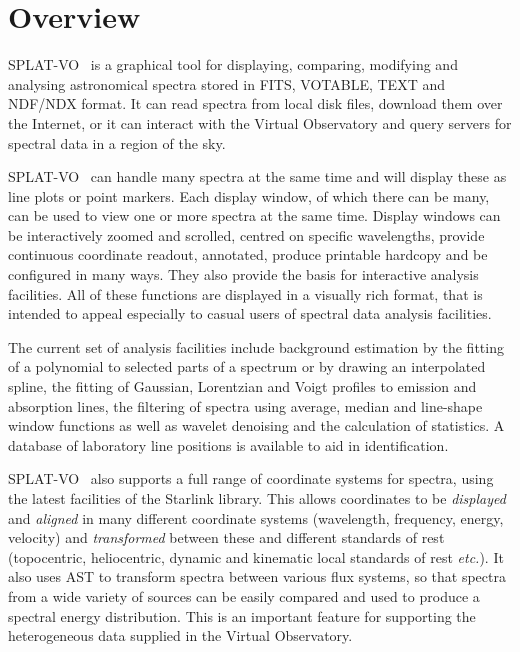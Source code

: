 \documentclass[twoside,11pt,nolof]{starlink}
\providecommand{\SPLAT}{\textsf{SPLAT-VO }}
\providecommand{\etc}{\textit{etc.}}
\begin{document}
\ifpdf
\else
\fi


\scfrontmatter

\section{Overview}

\SPLAT\ is a graphical tool for displaying, comparing, modifying and analysing
astronomical spectra stored in FITS, VOTABLE, TEXT and NDF/NDX format. It can read
spectra from local disk files, download them over the Internet, or it can
interact with the Virtual Observatory and query servers for spectral data in a
region of the sky.

\SPLAT\ can handle many spectra at the same time and will display these as
line plots or point markers.
Each display window, of which there can be many, can be used to
view one or more spectra at the same time.
Display windows can be interactively zoomed and scrolled, centred on
specific wavelengths, provide continuous coordinate readout, annotated,
produce printable hardcopy and be configured in many ways.
They also provide the basis for interactive analysis facilities.
All of these functions are displayed in a visually rich format, that
is intended to appeal especially to casual users of spectral data
analysis facilities.

The current set of analysis facilities include background estimation by the
fitting of a polynomial to selected parts of a spectrum or by drawing an
interpolated spline, the fitting of Gaussian, Lorentzian and Voigt profiles to
emission and absorption lines, the filtering of spectra using average,
median and line-shape window functions as well as wavelet denoising and
the calculation of statistics.
A database of laboratory line positions is available to aid in identification.

\SPLAT\ also supports a full range of coordinate systems for spectra,
using the latest facilities of the Starlink 
library.
This allows coordinates to be \textit{displayed} and \textit{aligned}
in many different coordinate systems (wavelength, frequency, energy,
velocity) and \textit{transformed} between these and different
standards of rest (topocentric, heliocentric, dynamic and kinematic
local standards of rest \etc).
It also uses AST to transform spectra between various flux systems, so that
spectra from a wide variety of sources can be easily compared and used to
produce a spectral energy distribution.
This is an important feature for supporting the heterogeneous data supplied
in the Virtual Observatory.
\end{document}
